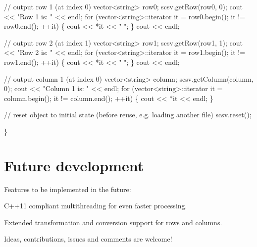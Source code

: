 \begin{DoxyCode}
    \textcolor{comment}{// output row 1 (at index 0)}
    vector<string> row0;
    scsv.getRow(row0, 0);
    cout << \textcolor{stringliteral}{"Row 1 is: "} << endl;
    \textcolor{keywordflow}{for} (vector<string>::iterator it = row0.begin(); it != row0.end(); ++it) \{
        cout << *it << \textcolor{stringliteral}{" "};
    \}
    cout << endl;

    \textcolor{comment}{// output row 2 (at index 1)}
    vector<string> row1;
    scsv.getRow(row1, 1);
    cout << \textcolor{stringliteral}{"Row 2 is: "} << endl;
    \textcolor{keywordflow}{for} (vector<string>::iterator it = row1.begin(); it != row1.end(); ++it) \{
        cout << *it << \textcolor{stringliteral}{" "};
    \}
    cout << endl;

    \textcolor{comment}{// output column 1 (at index 0)}
    vector<string> column;
    scsv.getColumn(column, 0);
    cout << \textcolor{stringliteral}{"Column 1 is: "} << endl;
    \textcolor{keywordflow}{for} (vector<string>::iterator it = column.begin(); it != column.end(); ++it) \{
        cout << *it << endl;
    \}

    \textcolor{comment}{// reset object to initial state (before reuse, e.g. loading another file)}
    scsv.reset();

\}
\end{DoxyCode}


\section*{Future development}

Features to be implemented in the future\+:


\begin{DoxyItemize}
\item C++11 compliant multithreading for even faster processing.
\item Extended transformation and conversion support for rows and columns.
\end{DoxyItemize}

Ideas, contributions, issues and comments are welcome! 